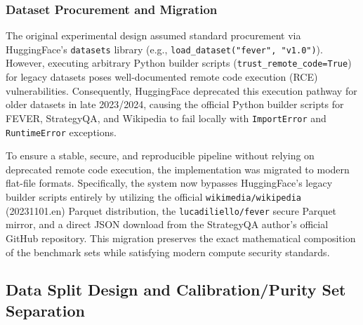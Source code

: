 \documentclass[12pt,a4paper]{article}
\theoremstyle{definition}
\begin{document}
\subsubsection{Dataset Procurement and Migration}

The original experimental design assumed standard procurement via HuggingFace's \texttt{datasets} library (e.g., \texttt{load\_dataset("fever", "v1.0")}). However, executing arbitrary Python builder scripts (\texttt{trust\_remote\_code=True}) for legacy datasets poses well-documented remote code execution (RCE) vulnerabilities. Consequently, HuggingFace deprecated this execution pathway for older datasets in late 2023/2024, causing the official Python builder scripts for FEVER, StrategyQA, and Wikipedia to fail locally with \texttt{ImportError} and \texttt{RuntimeError} exceptions.

To ensure a stable, secure, and reproducible pipeline without relying on deprecated remote code execution, the implementation was migrated to modern flat-file formats. Specifically, the system now bypasses HuggingFace's legacy builder scripts entirely by utilizing the official \texttt{wikimedia/wikipedia} (20231101.en) Parquet distribution, the \texttt{lucadiliello/fever} secure Parquet mirror, and a direct JSON download from the StrategyQA author's official GitHub repository. This migration preserves the exact mathematical composition of the benchmark sets while satisfying modern compute security standards.

\subsection{Data Split Design and Calibration/Purity Set Separation}
\end{document}
